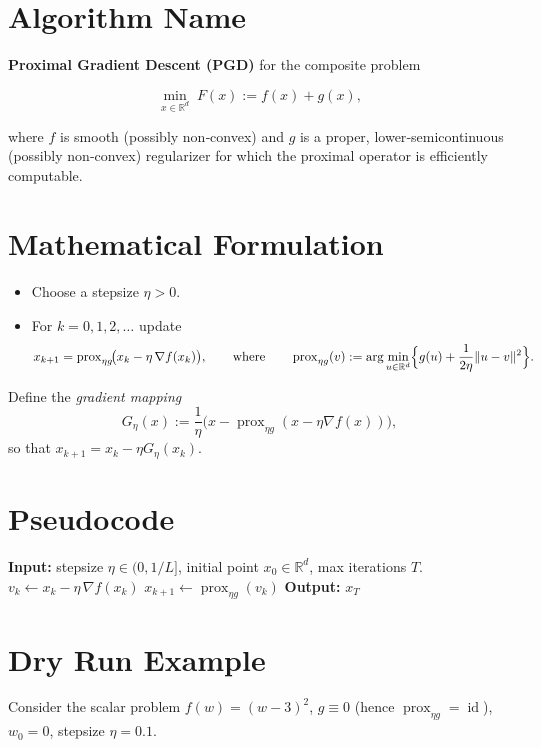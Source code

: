 \documentclass{article}
\newcommand{\prox}{\operatorname{prox}}
\newcommand{\grad}{\nabla}
\newcommand{\R}{\mathbb{R}}
\begin{document}
\section*{Algorithm Name}
\textbf{Proximal Gradient Descent (PGD)} for the composite problem  

\[
\min_{x\in\R^{d}} \; F(x):=f(x)+g(x),
\]

where $f$ is smooth (possibly non‑convex) and $g$ is a proper, lower‑semicontinuous (possibly non‑convex) regularizer for which the proximal operator is efficiently computable.

\section*{Mathematical Formulation}
\begin{itemize}
    \item Choose a stepsize $\eta>0$.
    \item For $k=0,1,2,\dots$ update
    \[
    x_{k+1}= \prox_{\eta g}\!\bigl(x_{k}-\eta\,\grad f(x_{k})\bigr),
    \qquad\text{where}\qquad
    \prox_{\eta g}(v):=\arg\min_{u\in\R^{d}}\Bigl\{ g(u)+\frac{1}{2\eta}\|u-v\|^{2}\Bigr\}.
    \]
\end{itemize}
Define the \emph{gradient mapping}
\[
G_{\eta}(x):=\frac{1}{\eta}\bigl(x-\prox_{\eta g}(x-\eta\grad f(x))\bigr),
\]
so that $x_{k+1}=x_{k}-\eta G_{\eta}(x_{k})$.

\section*{Pseudocode}
\begin{algorithm}[H]
\caption{Proximal Gradient Descent}
\begin{algorithmic}[1]
\State \textbf{Input:} stepsize $\eta\in(0,1/L]$, initial point $x_{0}\in\R^{d}$, max iterations $T$.
    \State $v_{k}\gets x_{k}-\eta\,\grad f(x_{k})$ 
    \State $x_{k+1}\gets \prox_{\eta g}(v_{k})$ 
\EndFor
\State \textbf{Output:} $x_{T}$
\end{algorithmic}
\end{algorithm}

\section*{Dry Run Example}
Consider the scalar problem $f(w)=(w-3)^{2}$, $g\equiv0$ (hence $\prox_{\eta g}= \operatorname{id}$), $w_{0}=0$, stepsize $\eta=0.1$.
\end{document}
